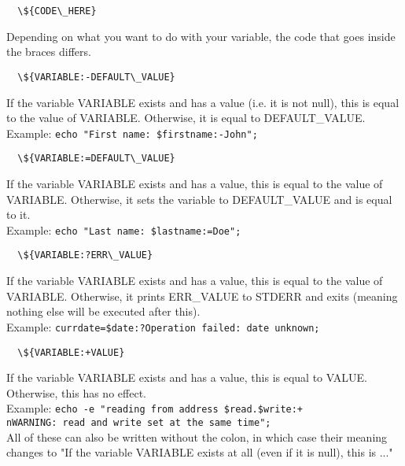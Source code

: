 \documentclass[hidelinks,12pt,a4paper,numbers=enddot]{scrartcl}
\begin{document}
\begin{verbatim}
  \${CODE\_HERE}
\end{verbatim}

Depending on what you want to do with your variable, the code
that goes inside the braces differs.\\

\begin{verbatim}
  \${VARIABLE:-DEFAULT\_VALUE}
\end{verbatim}

If the variable VARIABLE exists and has a value (i.e. it is not null), this is equal to
the value of VARIABLE.
Otherwise, it is equal to DEFAULT\_VALUE.\\

Example: \texttt{echo "First name: \${firstname:-John}";}\\

\begin{verbatim}
  \${VARIABLE:=DEFAULT\_VALUE}
\end{verbatim}

If the variable VARIABLE exists and has a value, this is equal to the value of VARIABLE.
Otherwise, it sets the variable to DEFAULT\_VALUE and is equal to it.\\
Example: \texttt{echo "Last name: \${lastname:=Doe}";}\\

\begin{verbatim}
  \${VARIABLE:?ERR\_VALUE}
\end{verbatim}

If the variable VARIABLE exists and has a value, this is equal to the value of VARIABLE.
Otherwise, it prints ERR\_VALUE to STDERR and exits (meaning nothing else will be executed
after this).\\
Example: \texttt{currdate=\${date:?Operation failed: date unknown};}\\

\begin{verbatim}
  \${VARIABLE:+VALUE}
\end{verbatim}

If the variable VARIABLE exists and has a value, this is equal to VALUE.
Otherwise, this has no effect.\\
Example: \texttt{echo -e "reading from address \$read.\${write:+\\nWARNING: read and write set
at the same time}";}\\

All of these can also be written without the colon, in which case their meaning changes to
"If the variable VARIABLE exists at all (even if it is null), this is ..."\\
\end{document}

